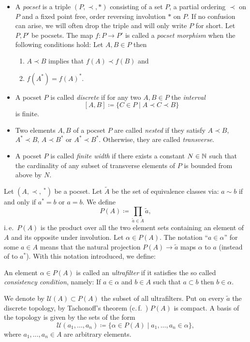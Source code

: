 \begin{defin}
  \begin{itemize}
  \item A \emph{pocset} is a triple \((P, \prec, \ast)\) consisting of a set \(P\), a partial ordering \(\prec\) on \(P\) and a fixed point free, order reversing involution \(\ast\) on \(P\). If no confusion can arise, we will often drop the triple and will only write \(P\) for short. Let \(P,P'\) be pocsets. The map \(f \colon P \to P'\) is called a \emph{pocset morphism} when the following conditions hold: Let \(A,B \in P\) then
    \begin{enumerate}
    \item \(A \prec B\) implies that \(f(A) \prec f(B)\) and
    \item \(f(A^\ast) = f(A)^\ast\). 
    \end{enumerate}
  \item A pocset \(P\) is called \emph{discrete} if for any two \(A, B \in P\) the \emph{interval}
    \[
      [A,B] \coloneqq \{C \in P \mid A \prec C \prec B\}
    \]
    is finite.
  \item Two elements \(A,B\) of a pocset \(P\) are called \emph{nested} if they satisfy \(A \prec B\), \(A^\ast \prec B\), \(A \prec B^\ast\) or \(A^\ast \prec B^\ast\). Otherwise, they are called \emph{transverse}.
  \item A pocset \(P\) is called \emph{finite width} if there exists a constant \(N \in \mathbb{N}\) such that the cardinality of any subset of transverse elements of \(P\) is bounded from above by \(N\).
  \end{itemize}
\end{defin}

\begin{defin}[Ultrafilter]
  Let \((A, \prec, \ ^\ast)\) be a pocset. Let \(\tilde A\) be the set of equivalence classes via: \(a \sim b\) if and only if \(a^\ast = b\) or \(a = b\). We define
  \[
    P(A) \coloneqq \prod_{\tilde a \in \tilde A} \tilde a,
  \]
  i.\,e.\ \(P(A)\) is the product over all the two element sets containing an element of \(A\) and its opposite under involution. Let \(\alpha \in P(A)\). The notation \enquote{\(a \in \alpha\)} for some \(a \in A\) means that the natural projection \(P(A) \to \tilde a\) maps \(\alpha\) to \(a\) (instead of to \(a^\ast\)). With this notation introduced, we define:
  
  An element \(\alpha \in P(A)\) is called an \emph{ultrafilter} if it satisfies the so called \emph{consistency condition}, namely: If \(a \in \alpha\) and \(b \in A\) such that \(a \subset b\) then \(b \in \alpha\).

  We denote by \(\mathcal{U}(A) \subset P(A)\) the subset of all ultrafilters. Put on every \(\tilde a\) the discrete topology, by Tachonoff's theorem (c.\,f.\ \cite[Chapter~10]{MR1275831}) \(P(A)\) is compact. A basis of the topology is given by the sets of the form
\[
  \mathcal{U}(a_1,\dots, a_n) \coloneqq \{\alpha \in P(A) \mid a_1, \dots, a_n \in \alpha\},
\]
where \(a_1,\dots, a_n \in A\) are arbitrary elements.
\end{defin}

